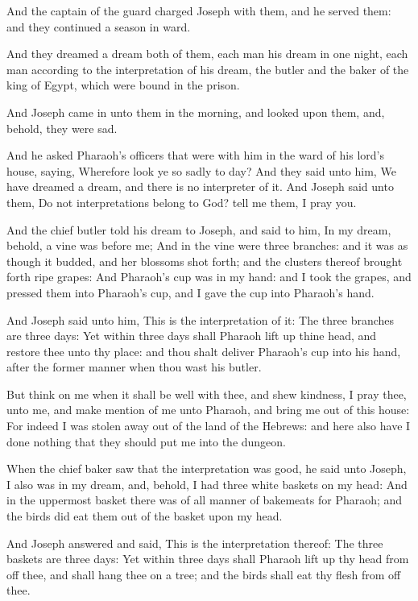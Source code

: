 \verse And the captain of the guard charged Joseph with them, and he
served them: and they continued a season in ward.

\verse And they dreamed a dream both of them, each man his dream in one
night, each man according to the interpretation of his dream, the
butler and the baker of the king of Egypt, which were bound in the
prison.

\verse And Joseph came in unto them in the morning, and looked upon
them, and, behold, they were sad.

\verse And he asked Pharaoh's officers that were with him in the ward of
his lord's house, saying, Wherefore look ye so sadly to day?  \verse And
they said unto him, We have dreamed a dream, and there is no
interpreter of it. And Joseph said unto them, Do not interpretations
belong to God? tell me them, I pray you.

\verse And the chief butler told his dream to Joseph, and said to him,
In my dream, behold, a vine was before me; \verse And in the vine were
three branches: and it was as though it budded, and her blossoms shot
forth; and the clusters thereof brought forth ripe grapes: \verse And
Pharaoh's cup was in my hand: and I took the grapes, and pressed them
into Pharaoh's cup, and I gave the cup into Pharaoh's hand.

\verse And Joseph said unto him, This is the interpretation of it: The
three branches are three days: \verse Yet within three days shall
Pharaoh lift up thine head, and restore thee unto thy place: and thou
shalt deliver Pharaoh's cup into his hand, after the former manner
when thou wast his butler.

\verse But think on me when it shall be well with thee, and shew
kindness, I pray thee, unto me, and make mention of me unto Pharaoh,
and bring me out of this house: \verse For indeed I was stolen away out
of the land of the Hebrews: and here also have I done nothing that
they should put me into the dungeon.

\verse When the chief baker saw that the interpretation was good, he
said unto Joseph, I also was in my dream, and, behold, I had three
white baskets on my head: \verse And in the uppermost basket there was
of all manner of bakemeats for Pharaoh; and the birds did eat them out
of the basket upon my head.

\verse And Joseph answered and said, This is the interpretation
thereof: The three baskets are three days: \verse Yet within three days
shall Pharaoh lift up thy head from off thee, and shall hang thee on a
tree; and the birds shall eat thy flesh from off thee.

